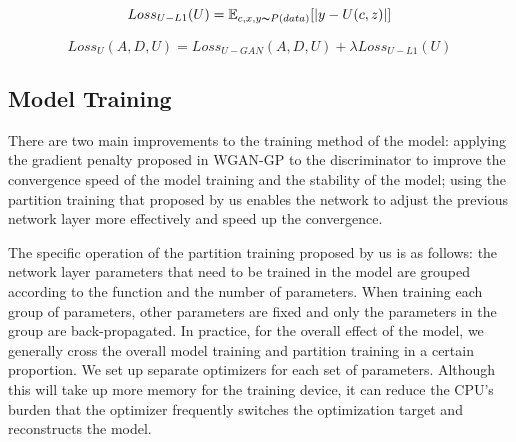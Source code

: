 \begin{equation}
    Loss_{U-L1}(U)=
    \mathbb{E}_{c,x,y\thicksim P(data)}[|y-U(c,z)|]
    \label{loss_u_l1}
\end{equation}

\begin{equation}
    Loss_{U}(A,D,U)=
    Loss_{U-GAN}(A,D,U)+
    \lambda Loss_{U-L1}(U)
    \label{loss_u}
\end{equation}

\subsection{Model Training}
There are two main improvements to the training method of the model:
    applying the gradient penalty proposed in WGAN-GP to the discriminator to improve the convergence speed of the model training and the stability of the model;
    using the partition training that proposed by us enables the network to adjust the previous network layer more effectively and speed up the convergence.

The specific operation of the partition training proposed by us is as follows: the network layer parameters that need to be trained in the model are grouped according to the function and the number of parameters.
When training each group of parameters, other parameters are fixed and only the parameters in the group are back-propagated.
In practice, for the overall effect of the model, we generally cross the overall model training and partition training in a certain proportion.
We set up separate optimizers for each set of parameters.
Although this will take up more memory for the training device, it can reduce the CPU's burden that the optimizer frequently switches the optimization target and reconstructs the model.